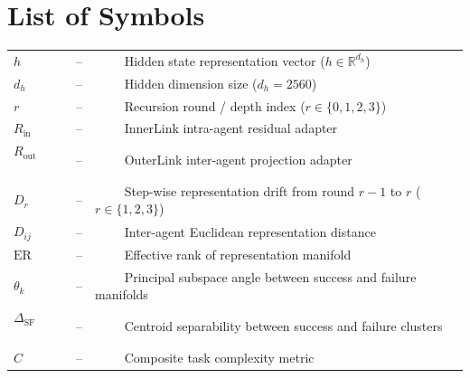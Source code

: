 \documentclass[a4paper, 12pt]{report}
\theoremstyle{definition}
\begin{document}
	\newpage
	\section*{{\huge List of Symbols}\hfill}
	\vspace{1.2cm}
	\noindent
	\begin{tabular}{lll}
		$h$ ~~~~&--&~~~~ Hidden state representation vector ($h \in \mathbb{R}^{d_h}$) \\
		$d_h$ ~~~~&--&~~~~ Hidden dimension size ($d_h = 2560$) \\
		$r$ ~~~~&--&~~~~ Recursion round / depth index ($r \in \{0, 1, 2, 3\}$) \\
		$R_{\text{in}}$ ~~~~&--&~~~~ InnerLink intra-agent residual adapter \\
		$R_{\text{out}}$ ~~~~&--&~~~~ OuterLink inter-agent projection adapter \\
		$D_r$ ~~~~&--&~~~~ Step-wise representation drift from round $r-1$ to $r$ ($r \in \{1, 2, 3\}$) \\
		$D_{ij}$ ~~~~&--&~~~~ Inter-agent Euclidean representation distance \\
		$\text{ER}$ ~~~~&--&~~~~ Effective rank of representation manifold \\
		$\theta_k$ ~~~~&--&~~~~ Principal subspace angle between success and failure manifolds \\
		$\Delta_{\text{SF}}$ ~~~~&--&~~~~ Centroid separability between success and failure clusters \\
		$C$ ~~~~&--&~~~~ Composite task complexity metric \\
	\end{tabular}

	\newpage
\end{document}
